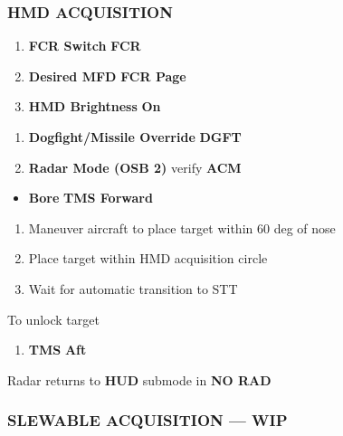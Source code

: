 \subsubsection{HMD ACQUISITION}
\begin{checklistenumerate}
    \begin{enumerate}
        \item \textbf{FCR Switch} \dotfill \textbf{FCR}
        \item \textbf{Desired MFD} \dotfill \textbf{FCR Page}
        \item \textbf{HMD Brightness} \dotfill \textbf{On}
    \end{enumerate}
    \begin{enumerate}
        \item \textbf{Dogfight/Missile Override} \dotfill \textbf{DGFT}
        \item \textbf{Radar Mode (OSB 2)} \dotfill verify \textbf{ACM}
    \end{enumerate}
    \begin{itemize}
        \item \textbf{Bore} \dotfill \textbf{TMS Forward}
    \end{itemize}
    \begin{enumerate}
        \item Maneuver aircraft to place target within 60 deg of nose 
        \item Place target within HMD acquisition circle
        \item Wait for automatic transition to STT 
    \end{enumerate}
    To unlock target
    \begin{enumerate}
        \item \textbf{TMS} \dotfill \textbf{Aft}
    \end{enumerate}
    Radar returns to \textbf{HUD} submode in \textbf{NO RAD}
\end{checklistenumerate}

\subsubsection{SLEWABLE ACQUISITION --- WIP}

\marginfigrestore